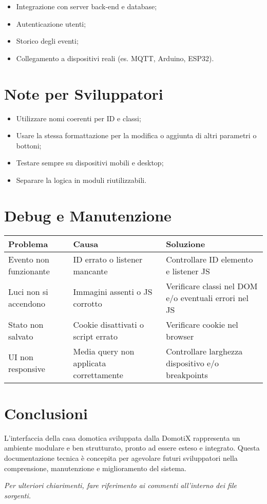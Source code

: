 \documentclass[a4paper,12pt]{article}
\begin{document}
\begin{itemize}
  \item Integrazione con server back-end e database;
  \item Autenticazione utenti;
  \item Storico degli eventi;
  \item Collegamento a dispositivi reali (es. MQTT, Arduino, ESP32).
\end{itemize}

\section{Note per Sviluppatori}

\begin{itemize}
  \item Utilizzare nomi coerenti per ID e classi;
  \item Usare la stessa formattazione per la modifica o aggiunta di altri parametri o bottoni;
  \item Testare sempre su dispositivi mobili e desktop;
  \item Separare la logica in moduli riutilizzabili.
\end{itemize}

\section{Debug e Manutenzione}

\begin{tabular}{|p{5cm}|p{5cm}|p{5cm}|}
\hline
\textbf{Problema} & \textbf{Causa} & \textbf{Soluzione} \\
\hline
Evento non funzionante & ID errato o listener mancante & Controllare ID elemento e listener JS \\
\hline
Luci non si accendono & Immagini assenti o JS corrotto & Verificare classi nel DOM e/o eventuali errori nel JS \\
\hline
Stato non salvato & Cookie disattivati o script errato & Verificare cookie nel browser \\
\hline
UI non responsive & Media query non applicata correttamente & Controllare larghezza dispositivo e/o breakpoints \\
\hline
\end{tabular}

\section{Conclusioni}

L'interfaccia della casa domotica sviluppata dalla DomotiX rappresenta un ambiente modulare e ben strutturato, pronto ad essere esteso e integrato. Questa documentazione tecnica è concepita per agevolare futuri sviluppatori nella comprensione, manutenzione e miglioramento del sistema.

\vspace{1cm}
\textit{Per ulteriori chiarimenti, fare riferimento ai commenti all'interno dei file sorgenti.}
\end{document}
